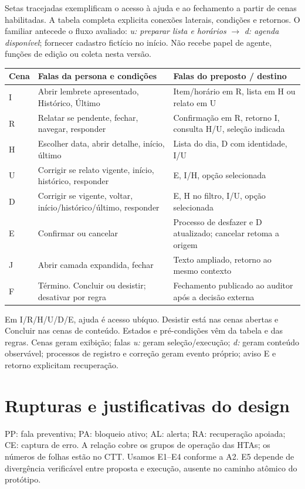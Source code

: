 Setas tracejadas exemplificam o acesso à ajuda e ao fechamento a partir de cenas habilitadas. A tabela completa explicita conexões laterais, condições e retornos. O familiar antecede o fluxo avaliado: \textit{u: preparar lista e horários} $\to$ \textit{d: agenda disponível}; fornecer cadastro fictício no início. Não recebe papel de agente, funções de edição ou coleta nesta versão.

\begin{center}\small
\begin{tabularx}{\columnwidth}{@{}lYY@{}}\toprule
Cena & Falas da persona e condições & Falas do preposto / destino\\\midrule
I & Abrir lembrete apresentado, Histórico, Último & Item/horário em R, lista em H ou relato em U\\
R & Relatar se pendente, fechar, navegar, responder & Confirmação em R, retorno I, consulta H/U, seleção indicada\\
H & Escolher data, abrir detalhe, início, último & Lista do dia, D com identidade, I/U\\
U & Corrigir se relato vigente, início, histórico, responder & E, I/H, opção selecionada\\
D & Corrigir se vigente, voltar, início/histórico/último, responder & E, H no filtro, I/U, opção selecionada\\
E & Confirmar ou cancelar & Processo de desfazer e D atualizado; cancelar retoma a origem\\
J & Abrir camada expandida, fechar & Texto ampliado, retorno ao mesmo contexto\\
F & Término. Concluir ou desistir; desativar por regra & Fechamento publicado ao auditor após a decisão externa\\\bottomrule
\end{tabularx}
\end{center}

Em I/R/H/U/D/E, ajuda é acesso ubíquo. Desistir está nas cenas abertas e Concluir nas cenas de conteúdo. Estados e pré-condições vêm da tabela e das regras. Cenas geram exibição; falas \textit{u:} geram seleção/execução; \textit{d:} geram conteúdo observável; processos de registro e correção geram evento próprio; aviso E e retorno explicitam recuperação.

\section{Rupturas e justificativas do design}\label{ap:rupturas}
PP: fala preventiva; PA: bloqueio ativo; AL: alerta; RA: recuperação apoiada; CE: captura de erro. A relação cobre os grupos de operação das HTAs; os números de folhas estão no CTT. Usamos E1--E4 conforme a A2. E5 depende de divergência verificável entre proposta e execução, ausente no caminho atômico do protótipo.

